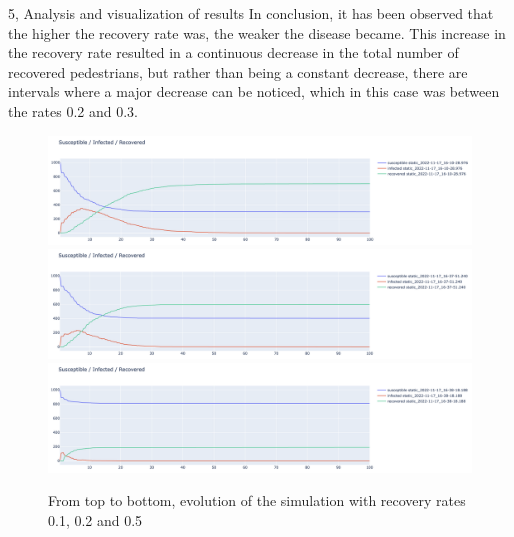 \documentclass[10pt,a4paper]{article}
\begin{document}
\begin{task}{5, Analysis and visualization of results}
In conclusion, it has been observed that the higher the recovery rate was, the weaker the disease became. This increase in the recovery rate resulted in a continuous decrease in the total number of recovered pedestrians, but rather than being a constant decrease, there are intervals where a major decrease can be noticed, which in this case was between the rates 0.2 and 0.3.

\begin{figure}[H]
    \includegraphics[width=15cm]{images/test2_evo01.png}
    \includegraphics[width=15cm]{images/test2_evo02.png}
    \includegraphics[width=15cm]{images/test2_evo05.png}
    \centering
    \caption{From top to bottom, evolution of the simulation with recovery rates 0.1, 0.2 and 0.5}
    \label{test2_evo}
\end{figure}

\begin{figure}[H]
\end{figure}
\end{task}
\end{document}
